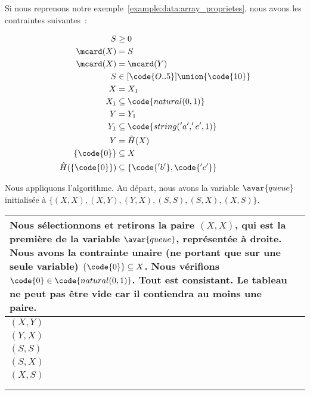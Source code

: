 \begin{example}

Si nous reprenons notre exemple~\ref{example:data:array_proprietes}, nous avons
les contraintes suivantes~:

\begin{align*}
%
S & \geq 0 \\
%
\mcard(X) & = S \\
%
\mcard(X) & = \mcard(Y) \\
%
S & \in [\code{O..5}] \union \{\code{10}\} \\
%
X & = X_1 \\
%
X_1 & \subseteq \code{natural(0, 1)} \\
%
Y & = Y_1 \\
%
Y_1 & \subseteq \code{string('a', 'e', 1)} \\
%
Y & = \hat{H}(X) \\
%
\{\code{0}\} & \subseteq X \\
%
\hat{H}(\{\code{0}\}) & \subseteq \{\code{'b'}, \code{'c'}\} \\
%
\end{align*}

Nous appliquons l'algorithme. Au départ, nous avons la variable $\avar{queue}$
initialisée à $\{(X, X), (X, Y), (Y, X), (S, S), (S, X), (X, S)\}$. 

\noindent
\begin{longtable}{m{}m{}}

Nous sélectionnons et retirons la paire $(X, X)$, qui est la première de la
variable $\avar{queue}$, représentée à droite. Nous avons la contrainte unaire
(ne portant que sur une seule variable) $\{\code{0}\} \subseteq X$. Nous
vérifions $\code{0} \in \code{natural(0, 1)}$.  Tout est consistant. Le tableau
ne peut pas être vide car il contiendra au moins une paire.
& 
\begin{tabular}{|c|}
\hline
$(X, X)$ \\
\hline
\hline
$(X, Y)$ \\
\hline
$(Y, X)$ \\
\hline
$(S, S)$ \\
\hline
$(S, X)$ \\
\hline
$(X, S)$ \\
\hline
\end{tabular}
\\

\\


\end{longtable}
\end{example}
